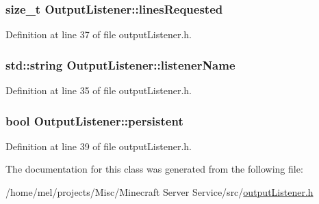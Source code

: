 \subsubsection[{\texorpdfstring{lines\+Requested}{linesRequested}}]{\setlength{\rightskip}{0pt plus 5cm}size\+\_\+t Output\+Listener\+::lines\+Requested}\hypertarget{class_output_listener_abb8ce2026a4a754052ab9eef9948bc1e}{}\label{class_output_listener_abb8ce2026a4a754052ab9eef9948bc1e}


Definition at line 37 of file output\+Listener.\+h.

\subsubsection[{\texorpdfstring{listener\+Name}{listenerName}}]{\setlength{\rightskip}{0pt plus 5cm}std\+::string Output\+Listener\+::listener\+Name}\hypertarget{class_output_listener_af6b1a417d85bbd263c9de3aa9f522874}{}\label{class_output_listener_af6b1a417d85bbd263c9de3aa9f522874}


Definition at line 35 of file output\+Listener.\+h.

\subsubsection[{\texorpdfstring{persistent}{persistent}}]{\setlength{\rightskip}{0pt plus 5cm}bool Output\+Listener\+::persistent}\hypertarget{class_output_listener_a51c65d7914c84d10a26cbf49534b449a}{}\label{class_output_listener_a51c65d7914c84d10a26cbf49534b449a}


Definition at line 39 of file output\+Listener.\+h.



The documentation for this class was generated from the following file\+:\begin{DoxyCompactItemize}
\item 
/home/mel/projects/\+Misc/\+Minecraft Server Service/src/\hyperlink{output_listener_8h}{output\+Listener.\+h}\end{DoxyCompactItemize}
